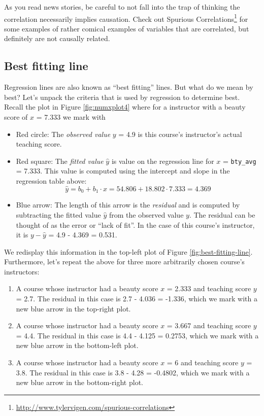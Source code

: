 \documentclass[12pt, krantz2,]{krantz}
\providecommand{\tightlist}{%
  \setlength{\itemsep}{0pt}\setlength{\parskip}{0pt}}
\renewcommand{\href}[2]{#2\footnote{\url{#1}}}
\begin{document}
As you read news stories, be careful to not fall into the trap of thinking the correlation necessarily implies causation. Check out \href{http://www.tylervigen.com/spurious-correlations}{Spurious Correlations} for some examples of rather comical examples of variables that are correlated, but definitely are not causally related.

\hypertarget{leastsquares}{%
\subsection{Best fitting line}\label{leastsquares}}

Regression lines are also known as ``best fitting'' lines. But what do we mean by best? Let's unpack the criteria that is used by regression to determine best. Recall the plot in Figure \ref{fig:numxplot4} where for a instructor with a beauty score of \(x\) = 7.333 we mark with

\begin{itemize}
\tightlist
\item
  Red circle: The \emph{observed value} \(y\) = 4.9 is this course's instructor's actual teaching score.
\item
  Red square: The \emph{fitted value} \(\widehat{y}\) is value on the regression line for \(x\) = \texttt{bty\_avg} = 7.333. This value is computed using the intercept and slope in the regression table above: \[\widehat{y} = b_0 + b_1 \cdot x = 54.806 + 18.802 \cdot 7.333 = 4.369\]
\item
  Blue arrow: The length of this arrow is the \emph{residual} and is computed by subtracting the fitted value \(\widehat{y}\) from the observed value \(y\). The residual can be thought of as the error or ``lack of fit''. In the case of this course's instructor, it is \(y - \widehat{y}\) = 4.9 - 4.369 = 0.531.
\end{itemize}

We redisplay this information in the top-left plot of Figure \ref{fig:best-fitting-line}. Furthermore, let's repeat the above for three more arbitrarily chosen course's instructors:

\begin{enumerate}
\def\labelenumi{\arabic{enumi}.}
\tightlist
\item
  A course whose instructor had a beauty score \(x\) = 2.333 and teaching score \(y\) = 2.7. The residual in this case is 2.7 - 4.036 = -1.336, which we mark with a new blue arrow in the top-right plot.
\item
  A course whose instructor had a beauty score \(x\) = 3.667 and teaching score \(y\) = 4.4. The residual in this case is 4.4 - 4.125 = 0.2753, which we mark with a new blue arrow in the bottom-left plot.
\item
  A course whose instructor had a beauty score \(x\) = 6 and teaching score \(y\) = 3.8. The residual in this case is 3.8 - 4.28 = -0.4802, which we mark with a new blue arrow in the bottom-right plot.
\end{enumerate}
\end{document}

